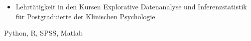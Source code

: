 \begin{experiences}
{\begin{itemize}
      \item Lehrtätigkeit in den Kursen Explorative Datenanalyse und Inferenzstatistik für Postgraduierte der Klinischen Psychologie
    \end{itemize}
  }
  {Python, R, SPSS, Matlab}
\end{experiences}
